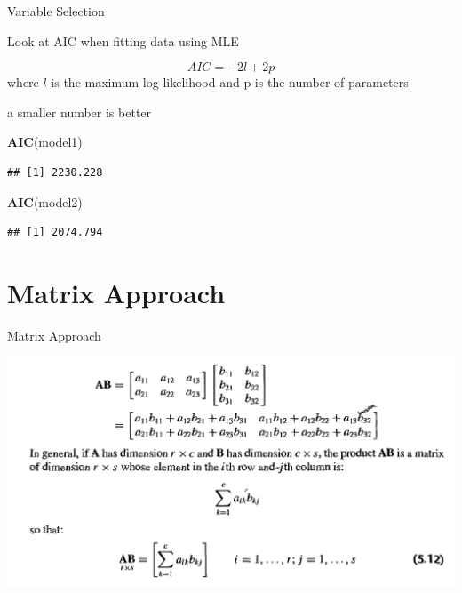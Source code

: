 \documentclass[
  ignorenonframetext,
]{beamer}
\newenvironment{Shaded}{\begin{snugshade}}{\end{snugshade}}
\newcommand{\KeywordTok}[1]{\textcolor[rgb]{0.13,0.29,0.53}{\textbf{#1}}}
\newcommand{\NormalTok}[1]{#1}
\begin{document}
\begin{frame}[fragile]{Variable Selection}
\protect\hypertarget{variable-selection}{}

Look at AIC when fitting data using MLE

\[
AIC = -2l + 2p
\] where \(l\) is the maximum log likelihood and p is the number of
parameters

a smaller number is better

\begin{Shaded}
\begin{Highlighting}[]
\KeywordTok{AIC}\NormalTok{(model1)}
\end{Highlighting}
\end{Shaded}

\begin{verbatim}
## [1] 2230.228
\end{verbatim}

\begin{Shaded}
\begin{Highlighting}[]
\KeywordTok{AIC}\NormalTok{(model2)}
\end{Highlighting}
\end{Shaded}

\begin{verbatim}
## [1] 2074.794
\end{verbatim}

\end{frame}

\hypertarget{matrix-approach}{%
\section{Matrix Approach}\label{matrix-approach}}

\begin{frame}{Matrix Approach}
\protect\hypertarget{matrix-approach-1}{}

\begin{center}\includegraphics[width=1\linewidth]{resources/Class 02 - matrix multiplication} \end{center}

\end{frame}
\end{document}
